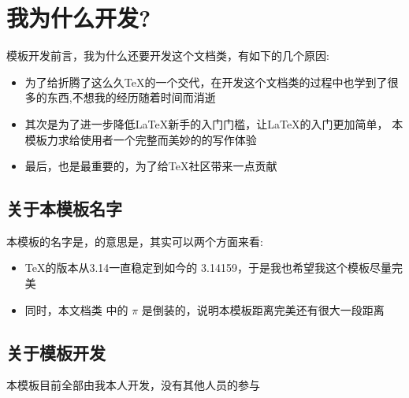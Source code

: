 \section{我为什么开发\zlatex{}?}
模板开发前言，我为什么还要开发这个文档类，有如下的几个原因:
\begin{itemize}
    \item 为了给折腾了这么久\TeX{}的一个交代，在开发这个文档类的过程中也学到了很多的东西,不想我的经历随着时间而消逝
    \item 其次是为了进一步降低\LaTeX{}新手的入门门槛，让\LaTeX{}的入门更加简单，
        本模板力求给使用者一个完整而美妙的的写作体验
    \item 最后，也是最重要的，为了给\TeX{}社区带来一点贡献
\end{itemize}
\subsection{关于本模板名字}
本模板的名字是\zlatex{}，\zlatex{}的意思是，其实可以两个方面来看:
\begin{itemize}
    \item \TeX{}的版本从3.14一直稳定到如今的 3.14159，于是我也希望我这个模板尽量完美
    \item 同时，本文档类 \zlatex{}中的 $\pi$ 是倒装的，说明本模板距离完美还有很大一段距离
\end{itemize}

\subsection{关于模板开发}
本模板目前全部由我本人开发，没有其他人员的参与
